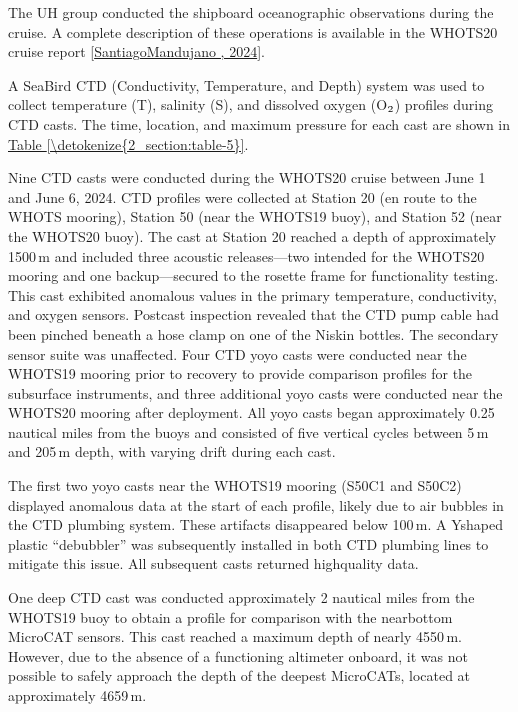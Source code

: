 \documentclass[a4paper,10pt,english,openany,oneside]{sphinxmanual}
\begin{document}
\sphinxAtStartPar
The UH group conducted the shipboard oceanographic observations during the
cruise. A complete description of these operations is available in the WHOTS\sphinxhyphen{}20
cruise report {[}\hyperlink{cite.references:id18}{Santiago\sphinxhyphen{}Mandujano , 2024}{]}.

\sphinxAtStartPar
A Sea\sphinxhyphen{}Bird CTD (Conductivity, Temperature, and Depth) system was used to
collect temperature (T), salinity (S), and dissolved oxygen (O\(\sb{\text{2}}\)) profiles
during CTD casts. The time, location, and maximum pressure for each cast are
shown in \hyperref[\detokenize{2_section:table-5}]{Table \ref{\detokenize{2_section:table-5}}}.

\sphinxAtStartPar
Nine CTD casts were conducted during the WHOTS\sphinxhyphen{}20 cruise between June 1 and
June 6, 2024. CTD profiles were collected at Station 20 (en route to the WHOTS
mooring), Station 50 (near the WHOTS\sphinxhyphen{}19 buoy), and Station 52 (near the
WHOTS\sphinxhyphen{}20 buoy). The cast at Station 20 reached a depth of approximately 1500 m
and included three acoustic releases—two intended for the WHOTS\sphinxhyphen{}20 mooring and
one backup—secured to the rosette frame for functionality testing. This cast
exhibited anomalous values in the primary temperature, conductivity, and oxygen
sensors. Post\sphinxhyphen{}cast inspection revealed that the CTD pump cable had been pinched
beneath a hose clamp on one of the Niskin bottles. The secondary sensor suite
was unaffected. Four CTD yo\sphinxhyphen{}yo casts were conducted near the WHOTS\sphinxhyphen{}19 mooring
prior to recovery to provide comparison profiles for the subsurface
instruments, and three additional yo\sphinxhyphen{}yo casts were conducted near the WHOTS\sphinxhyphen{}20
mooring after deployment. All yo\sphinxhyphen{}yo casts began approximately 0.25 nautical
miles from the buoys and consisted of five vertical cycles between 5 m and
205 m depth, with varying drift during each cast.

\sphinxAtStartPar
The first two yo\sphinxhyphen{}yo casts near the WHOTS\sphinxhyphen{}19 mooring (S50C1 and S50C2) displayed
anomalous data at the start of each profile, likely due to air bubbles in the
CTD plumbing system. These artifacts disappeared below 100 m. A Y\sphinxhyphen{}shaped
plastic “de\sphinxhyphen{}bubbler” was subsequently installed in both CTD plumbing lines to
mitigate this issue. All subsequent casts returned high\sphinxhyphen{}quality data.

\sphinxAtStartPar
One deep CTD cast was conducted approximately 2 nautical miles from the
WHOTS\sphinxhyphen{}19 buoy to obtain a profile for comparison with the near\sphinxhyphen{}bottom MicroCAT
sensors. This cast reached a maximum depth of nearly 4550 m. However, due to
the absence of a functioning altimeter onboard, it was not possible to safely
approach the depth of the deepest MicroCATs, located at approximately 4659 m.
\end{document}
